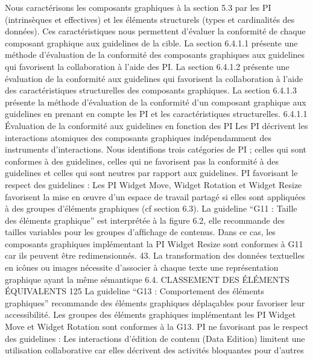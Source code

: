 \documentclass{article}
\begin{document}
Nous caract\'{e}risons les composants graphiques \`{a} la section 5.3 par les PI (intrins\`{e}ques et effectives)
et les \'{e}l\'{e}ments structurels (types et cardinalit\'{e}s des donn\'{e}es). Ces caract\'{e}ristiques nous permettent
d’\'{e}valuer la conformit\'{e} de chaque composant graphique aux guidelines de la cible.
La section 6.4.1.1 pr\'{e}sente une m\'{e}thode d’\'{e}valuation de la conformit\'{e} des composants graphiques
aux guidelines qui favorisent la collaboration \`{a} l’aide des PI. La section 6.4.1.2 pr\'{e}sente une \'{e}valuation de la conformit\'{e} aux guidelines qui favorisent la collaboration \`{a} l’aide des caract\'{e}ristiques
structurelles des composants graphiques. La section 6.4.1.3 pr\'{e}sente la m\'{e}thode d’\'{e}valuation de la
conformit\'{e} d’un composant graphique aux guidelines en prenant en compte les PI et les caract\'{e}ristiques structurelles.
6.4.1.1
Évaluation de la conformit\'{e} aux guidelines en fonction des PI
Les PI d\'{e}crivent les interactions atomiques des composants graphiques ind\'{e}pendamment des instruments d’interactions. Nous identiﬁons trois cat\'{e}gories de PI ; celles qui sont conformes \`{a} des guidelines, celles qui ne favorisent pas la conformit\'{e} \`{a} des guidelines et celles qui sont neutres par rapport
aux guidelines.
PI favorisant le respect des guidelines :
Les PI Widget Move, Widget Rotation et Widget Resize
favorisent la mise en œuvre d’un espace de travail partag\'{e} si elles sont appliqu\'{e}es \`{a} des groupes
d’\'{e}l\'{e}ments graphiques (cf section 6.3).
La guideline “G11 : Taille des \'{e}l\'{e}ments graphique” est interpr\'{e}t\'{e}e \`{a} la ﬁgure 6.2, elle recommande des tailles variables pour les groupes d’afﬁchage de contenus. Dans ce cas, les composants
graphiques impl\'{e}mentant la PI Widget Resize sont conformes \`{a} G11 car ils peuvent \^{e}tre redimensionn\'{e}s.
43. La transformation des donn\'{e}es textuelles en ic\^{o}nes ou images n\'{e}cessite d’associer \`{a} chaque texte une repr\'{e}sentation
graphique ayant la m\^{e}me s\'{e}mantique
6.4. CLASSEMENT DES ÉLÉMENTS ÉQUIVALENTS
125
La guideline “G13 : Comportement des \'{e}l\'{e}ments graphiques” recommande des \'{e}l\'{e}ments graphiques d\'{e}pla\c{c}ables pour favoriser leur accessibilit\'{e}. Les groupes des \'{e}l\'{e}ments graphiques impl\'{e}mentant les PI Widget Move et Widget Rotation sont conformes \`{a} la G13.
PI ne favorisant pas le respect des guidelines :
Les interactions d’\'{e}dition de contenu (Data Edition) limitent une utilisation collaborative car elles d\'{e}crivent des activit\'{e}s bloquantes pour d’autres
\end{document}
